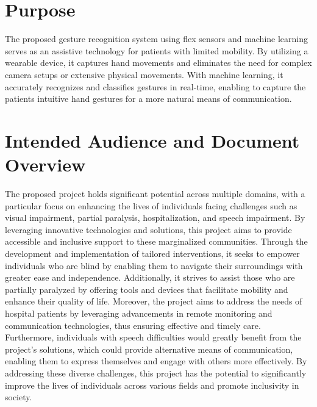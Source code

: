 \documentclass[a4paper,12pt,oneside]{report}
\begin{document}
	
 \section{Purpose}
 \par The proposed gesture recognition system using flex sensors and
machine learning serves as an assistive technology for patients with
limited mobility. By utilizing a wearable device, it captures hand
movements and eliminates the need for complex camera setups or
extensive physical movements. With machine learning, it accurately
recognizes and classifies gestures in real-time, enabling to capture the
patients intuitive hand gestures for a more natural means of
communication.
\par
\par


	
	

 \section{Intended Audience and Document Overview} 
	
 \par 
 The proposed project holds significant potential across multiple domains, with a particular focus on enhancing the lives of individuals facing challenges such as visual impairment, partial paralysis, hospitalization, and speech impairment. By leveraging innovative technologies and solutions, this project aims to provide accessible and inclusive support to these marginalized communities. Through the development and implementation of tailored interventions, it seeks to empower individuals who are blind by enabling them to navigate their surroundings with greater ease and independence. Additionally, it strives to assist those who are partially paralyzed by offering tools and devices that facilitate mobility and enhance their quality of life. Moreover, the project aims to address the needs of hospital patients by leveraging advancements in remote monitoring and communication technologies, thus ensuring effective and timely care. Furthermore, individuals with speech difficulties would greatly benefit from the project's solutions, which could provide alternative means of communication, enabling them to express themselves and engage with others more effectively. By addressing these diverse challenges, this project has the potential to significantly improve the lives of individuals across various fields and promote inclusivity in society.
\end{document}
